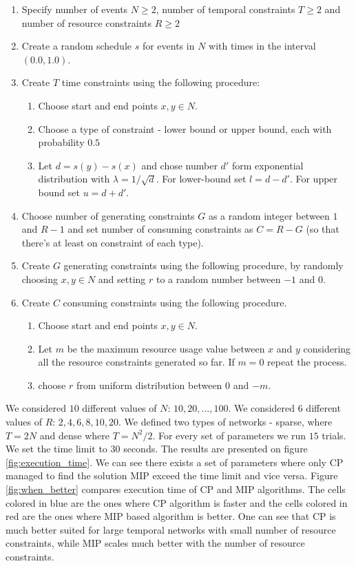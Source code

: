 \small{
  \begin{enumerate}
  \setlength\itemsep{0.1em}
  \item Specify number of events $N \geq 2$, number of temporal constraints $T\geq 2$ and number of resource constraints $R\geq 2$
  \item Create a random schedule $s$ for events in $N$ with times in the interval $(0.0, 1.0)$.
  \item Create $T$ time constraints using the following procedure:
    \begin{enumerate}
    \item Choose start and end points $x,y \in N$.
    \item Choose a type of constraint - lower bound or upper bound, each with probability $0.5$
    \item Let $d=s(y) - s(x)$ and chose number $d'$ form exponential distribution with $\lambda = 1 / \sqrt{d}$. For lower-bound set $l = d - d'$. For upper bound set $u = d + d'$.
    \end{enumerate}
  \item Choose number of generating constraints $G$ as a random integer between $1$ and $R-1$ and set number of consuming constraints as $C = R - G$ (so that there's at least on constraint of each type).
  \item Create $G$ generating constraints using the following procedure, by randomly choosing $x,y \in N$ and setting $r$ to a random number between $-1$ and $0$.
  \item Create $C$ consuming constraints using the following procedure.
    \begin{enumerate}
    \item Choose start and end points $x,y \in N$.
    \item Let $m$ be the maximum resource usage value between $x$ and $y$ considering all the resource constraints generated so far. If $m = 0$ repeat the process.
    \item choose $r$ from uniform distribution between $0$ and $-m$.
    \end{enumerate}
  \end{enumerate}
}

We considered $10$ different values of $N$: $10, 20, ..., 100$. We considered $6$ different values of $R$: $2, 4, 6, 8, 10, 20$. We defined two types of networks - sparse, where $T = 2N$ and dense where $T = N^2/2$. For every set of parameters we run $15$ trials. We set the time limit to $30$ seconds. The results are presented on figure \ref{fig:execution_time}. We can see there exists a set of parameters where only CP managed to find the solution MIP exceed the time limit and vice versa. Figure \ref{fig:when_better} compares execution time of CP and MIP algorithms. The cells colored in blue are the ones where CP algorithm is faster and the cells colored in red are the ones where MIP based algorithm is better. One can see that CP is much better suited for large temporal networks with small number of resource constraints, while MIP scales much better with the number of resource constraints.

